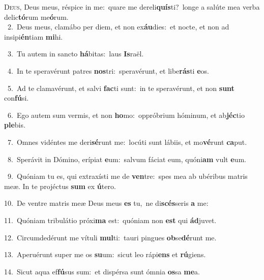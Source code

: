 \lettrine{\initial\textcolor{\initialcolor}{D}}{eus,} Deus meus, réspice in me:~\dagger quare me dereli\-\textbf{quís}\-ti?~\star longe a salúte mea verba delic\-\textbf{tó}\-rum me\-\textbf{ó}\-rum.\\
{\numbfont\textcolor{\numbcolor}{~2.}}~Deus meus, clamábo per diem, et non ex\-\textbf{áu}\-dies:~\star et nocte, et non ad insipi\-\textbf{én}\-tiam \textbf{mi}\-hi.\par
{\numbfont\textcolor{\numbcolor}{~3.}}~Tu autem in sancto \textbf{há}\-bitas:~\star laus \textbf{Is}\-raël.\par
{\numbfont\textcolor{\numbcolor}{~4.}}~In te speravérunt patres \textbf{nos}\-tri:~\star speravérunt, et libe\-\textbf{rás}\-ti \textbf{e}\-os.\par
{\numbfont\textcolor{\numbcolor}{~5.}}~Ad te clamavérunt, et salvi \textbf{fac}\-ti sunt:~\star in te speravérunt, et non \textbf{sunt} con\-\textbf{fú}\-si.\par
{\numbfont\textcolor{\numbcolor}{~6.}}~Ego autem sum vermis, et non \textbf{ho}\-mo:~\star oppróbrium hóminum, et ab\-\textbf{jéc}\-tio \textbf{ple}\-bis.\par
{\numbfont\textcolor{\numbcolor}{~7.}}~Omnes vidéntes me deri\-\textbf{sé}\-runt me:~\star locúti sunt lábiis, et mo\-\textbf{vé}\-runt \textbf{ca}\-put.\par
{\numbfont\textcolor{\numbcolor}{~8.}}~Sperávit in Dómino, erípiat \textbf{e}\-um:~\star salvum fáciat eum, quóni\textbf{am} vult \textbf{e}\-um.\par
{\numbfont\textcolor{\numbcolor}{~9.}}~Quóniam tu es, qui extraxísti me de \textbf{ven}\-tre:~\star spes mea ab ubéribus matris meæ. In te projéctus \textbf{sum} ex \textbf{ú}\-tero.\par
{\numbfont\textcolor{\numbcolor}{10.}}~De ventre matris meæ Deus meus \textbf{es} tu,~\star ne di\-\textbf{scés}\-seris \textbf{a} me:\par
{\numbfont\textcolor{\numbcolor}{11.}}~Quóniam tribulátio próxi\textbf{ma} est:~\star quóniam non \textbf{est} qui \textbf{ád}\-juvet.\par
{\numbfont\textcolor{\numbcolor}{12.}}~Circumdedérunt me vítuli \textbf{mul}\-ti:~\star tauri pingues \textbf{ob}\-se\-\textbf{dé}\-runt me.\par
{\numbfont\textcolor{\numbcolor}{13.}}~Aperuérunt super me os \textbf{su}\-um:~\star sicut leo rápi\textbf{ens} et \textbf{rú}\-giens.\par
{\numbfont\textcolor{\numbcolor}{14.}}~Sicut aqua ef\-\textbf{fú}\-sus sum:~\star et dispérsa sunt ómnia \textbf{os}\-sa \textbf{me}\-a.\par
